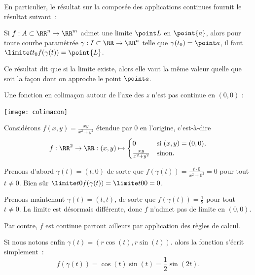 \begin{frame}
  En particulier, le résultat sur la composée des applications continues fournit le résultat suivant~:\pause{}
  \begin{corollary}Si \(f : A \subset \RR^{n} \to \RR^{m}\) admet une limite \({\point L}\) en \(\point{a}\),\pause{} alors pour toute courbe paramétrée \(\gamma : I \subset \RR \to \RR^{n}\) telle que \(\gamma(t_{0}) = \point a\)\pause{}, il faut \(\limite t {t_{0}} f(\gamma(t)) = \point{L}\).\pause{}
  \end{corollary}%
  \begin{remark*}
    Ce résultat dit que si la limite existe, alors elle vaut la même valeur quelle que soit la façon dont on approche le point \(\point a\).\pause{}
  \end{remark*}\pause{}
\end{frame}
\begin{frame}
\begin{example}
 Une \og fonction en colimaçon\fg{} autour de l'axe des \(z\) n'est pas continue en \((0,0)\) :
    \begin{center}\pause{}
      \texttt{[image: colimacon]}
    \end{center}
  \end{example}
\end{frame}
\begin{frame}
  \begin{example}
    Considérons \(f(x,y) = \frac{xy}{x^{2} + y^{2}}\) étendue par \(0\) en l'origine, c'est-à-dire\pause{}
    \begin{equation*}
      f : \RR^2 \to \RR  : (x,y) \mapsto
      \begin{cases}
        0 & \text{si \((x,y) = (0,0)\),}\\
        \frac{xy}{x^{2} + y^{2}} & \text{sinon.}
      \end{cases}
    \end{equation*}\pause{}

    Prenons d'abord \(\gamma(t) = (t,0)\) de sorte que\pause{} \(f(\gamma(t)) = \frac{t \cdot 0}{x^{2} + 0^{2}} = 0\) pour tout \(t \neq 0\). \pause{}Bien sûr \(\limite t 0 f(\gamma(t)) = \limite t 0 0 = 0\).\pause{}

    Prenons maintenant \(\gamma(t) = (t,t)\), de sorte que \(f(\gamma(t)) = \frac12\) pour tout \(t \neq 0\).\pause{} La limite est désormais différente, donc \(f\) n'admet pas de limite en \((0,0)\).\pause{}

    Par contre, \(f\) est continue partout ailleurs par application des règles de calcul.\pause{}

    Si nous notons enfin \(\gamma(t) = (r \cos(t), r\sin(t))\).\pause{} alors la fonction s'écrit simplement~:
    \begin{equation*}
      f(\gamma(t)) = \cos(t)\sin(t) = \frac12 \sin(2t).
    \end{equation*}
  \end{example}
\end{frame}
